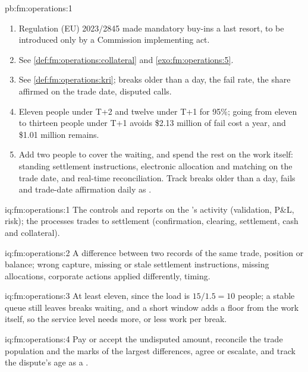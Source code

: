 \begin{solution}{pb:fm:operations:1}
\begin{enumerate}
\item Regulation (EU) 2023/2845 made mandatory buy-ins a last resort, to be introduced only by a Commission implementing act.
\item See \cref{def:fm:operations:collateral} and \cref{exo:fm:operations:5}.
\item See \cref{def:fm:operations:kri}; breaks older than a day, the fail rate, the share affirmed on the trade date, disputed calls.
\item Eleven people under T+2 and twelve under T+1 for 95\%; going from eleven to thirteen people under T+1 avoids \$2.13 million of fail cost a year,
and \$1.01 million remains.
\item Add two people to cover the waiting, and spend the rest on the work itself: standing settlement instructions, electronic allocation and
matching on the trade date, and real-time reconciliation. Track breaks older than a day, fails and trade-date affirmation daily as .
\end{enumerate}
\end{solution}

\begin{solution}{iq:fm:operations:1}
The  controls and reports on the 's activity (validation, P\&L, risk); the  processes trades to settlement
(confirmation, clearing, settlement, cash and collateral).
\end{solution}

\begin{solution}{iq:fm:operations:2}
A difference between two records of the same trade, position or balance; wrong capture, missing or stale settlement instructions, missing
allocations, corporate actions applied differently, timing.
\end{solution}

\begin{solution}{iq:fm:operations:3}
At least eleven, since the load is $15/1.5=10$ people; a stable queue still leaves breaks waiting, and a short window adds a floor from the work
itself, so the service level needs more, or less work per break.
\end{solution}

\begin{solution}{iq:fm:operations:4}
Pay or accept the undisputed amount, reconcile the trade population and the marks of the largest differences, agree or escalate, and track the
dispute's age as a .
\end{solution}

